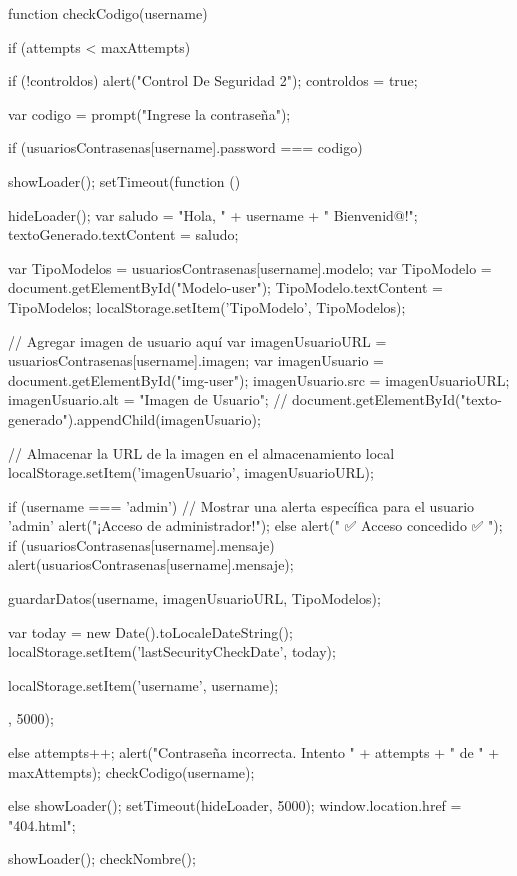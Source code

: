 {      function checkCodigo(username) {
        if (attempts < maxAttempts) {
            if (!controldos) {
                alert("Control De Seguridad 2");
                controldos = true;
            }
    
            var codigo = prompt("Ingrese la contraseña");
    
            if (usuariosContrasenas[username].password === codigo) {
                showLoader();
                setTimeout(function () {
                    hideLoader();
                    var saludo = "Hola, " + username + " Bienvenid@!";
                    textoGenerado.textContent = saludo;
  
                    var TipoModelos = usuariosContrasenas[username].modelo;
                    var TipoModelo = document.getElementById("Modelo-user");
                    TipoModelo.textContent = TipoModelos;
                    localStorage.setItem('TipoModelo', TipoModelos);
  
                    // Agregar imagen de usuario aquí
                    var imagenUsuarioURL = usuariosContrasenas[username].imagen;
                    var imagenUsuario = document.getElementById("img-user");
                    imagenUsuario.src = imagenUsuarioURL;
                    imagenUsuario.alt = "Imagen de Usuario";
                    // document.getElementById("texto-generado").appendChild(imagenUsuario);
  
                    // Almacenar la URL de la imagen en el almacenamiento local
                    localStorage.setItem('imagenUsuario', imagenUsuarioURL);
    
                    if (username === 'admin') {
                        // Mostrar una alerta específica para el usuario 'admin'
                        alert("¡Acceso de administrador!");
                    } else {
                        alert(" ✅ Acceso concedido ✅ ");
                    }
                    if (usuariosContrasenas[username].mensaje) {
                      alert(usuariosContrasenas[username].mensaje);
                  }
  
                    guardarDatos(username, imagenUsuarioURL, TipoModelos);
    
                    var today = new Date().toLocaleDateString();
                    localStorage.setItem('lastSecurityCheckDate', today);
    
                    localStorage.setItem('username', username);
                }, 5000);
            } else {
                attempts++;
                alert("Contraseña incorrecta. Intento " + attempts + " de " + maxAttempts);
                checkCodigo(username);
            }
        } else {
            showLoader();
            setTimeout(hideLoader, 5000);
            window.location.href = "404.html";
        }
    }
  
      showLoader();
      checkNombre();
  }
  
